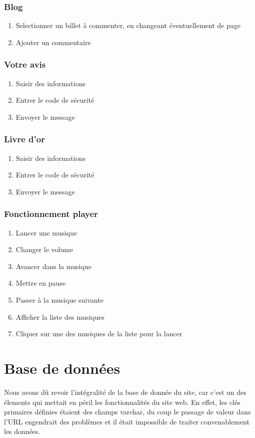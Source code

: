 \documentclass[11pt]{report}
\begin{document}
\subsubsection*{Blog}
\begin{enumerate}
\item Selectionner un billet à commenter, en changeant éventuellement de page
\item Ajouter un commentaire
\end{enumerate}
\subsubsection*{Votre avis}
\begin{enumerate}
\item Saisir des informations 
\item Entrer le code de sécurité
\item Envoyer le message
\end{enumerate}
\subsubsection*{Livre d’or}
\begin{enumerate}
\item Saisir des informations 
\item Entrer le code de sécurité
\item Envoyer le message
\end{enumerate}

\subsubsection*{Fonctionnement player}
\begin{enumerate}
 \item Lancer une musique
 \item Changer le volume
\item Avancer dans la musique
\item Mettre en pause
\item Passer à la musique suivante
\item Afficher la liste des musiques
\item Cliquer sur une des musiques de la liste pour la lancer
 
\end{enumerate}



\section{Base de données}
Nous avons dû revoir l'intégralité de la base de donnée du site, car c'est un
des élements qui mettait en péril les fonctionnalités du site web. En effet, les
clés primaires définies étaient des champs varchar, du coup le passage de valeur
dans l'URL engendrait des problèmes et il était impossible de traiter
convenablement les données. \\
\end{document}
